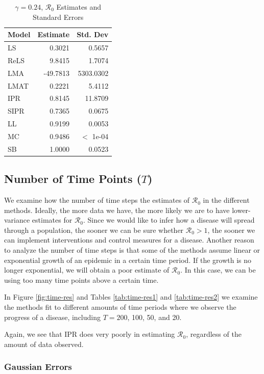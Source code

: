 \documentclass[12pt]{article}
\newcommand{\rr}{\ensuremath{\mathcal{R}_0}}
\begin{document}
\begin{table}[H]
	
	\centering
	\begin{tabular}[t]{l|r|r}
		\hline
		Model & Estimate & Std. Dev\\
		\hline
		LS & 0.3021 & 0.5657\\
		\hline
		ReLS & 9.8415 & 1.7074\\
		\hline
		LMA & -49.7813 & 5303.0302\\
		\hline
		LMAT & 0.2221 & 5.4112\\
		\hline
		IPR & 0.8145 & 11.8709\\
		\hline
		SIPR & 0.7365 & 0.0675\\
		\hline
		LL & 0.9199 & 0.0053\\
		\hline
		MC & 0.9486 & $<$ 1e-04\\
		\hline
		SB & 1.0000 & 0.0523\\
		\hline
	\end{tabular}
	\caption{$\gamma = 0.24$, $\rr$ Estimates and Standard Errors}
\end{table}

\subsection{Number of Time Points ($T$)}\label{sec:res-time}
We examine how the number of time steps the estimates of $\rr$ in the different methods.  Ideally, the more data we have, the more likely we are to have lower-variance estimates for $\rr$.  Since we would like to  infer how a disease will spread through a population, the sooner we can be sure whether $\rr> 1$, the sooner we can implement interventions and control measures for a disease.  Another reason to analyze the number of time steps is that some of the methods assume linear or exponential growth of an epidemic in a certain time period.  If the growth is no longer exponential, we will obtain a poor estimate of $\rr$.  In this case, we can be using too many time points above a certain time.

In Figure \ref{fig:time-res} and Tables \ref{tab:time-res1} and \ref{tab:time-res2} we examine the methods fit to different amounts of time periods where we observe the progress of a disease, including $T=200$, 100, 50, and 20.

Again, we see that IPR does very poorly in estimating $\rr$, regardless of the amount of data observed.

\subsubsection{Gaussian Errors}
\end{document}

